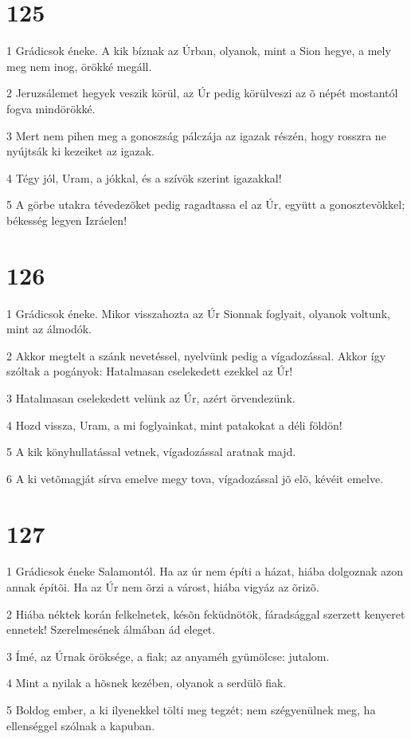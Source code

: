\chapter{125}

\par 1 Grádicsok éneke. A kik bíznak az Úrban, olyanok, mint a Sion hegye, a mely meg nem inog, örökké megáll.
\par 2 Jeruzsálemet hegyek veszik körül, az Úr pedig körülveszi az õ népét mostantól fogva mindörökké.
\par 3 Mert nem pihen meg a gonoszság pálczája az igazak részén, hogy rosszra ne nyújtsák ki kezeiket az igazak.
\par 4 Tégy jól, Uram, a jókkal, és a szívök szerint igazakkal!
\par 5 A görbe utakra tévedezõket pedig ragadtassa el az Úr, együtt a gonosztevõkkel; békesség legyen Izráelen!

\chapter{126}

\par 1 Grádicsok éneke. Mikor visszahozta az Úr Sionnak foglyait, olyanok voltunk, mint az álmodók.
\par 2 Akkor megtelt a szánk nevetéssel, nyelvünk pedig a vígadozással. Akkor így szóltak a pogányok: Hatalmasan cselekedett ezekkel az Úr!
\par 3 Hatalmasan cselekedett velünk az Úr, azért örvendezünk.
\par 4 Hozd vissza, Uram, a mi foglyainkat, mint patakokat a déli földön!
\par 5 A kik könyhullatással vetnek, vígadozással aratnak majd.
\par 6 A ki vetõmagját sírva emelve megy tova, vígadozással jõ elõ, kévéit emelve.

\chapter{127}

\par 1 Grádicsok éneke Salamontól. Ha az úr nem építi a házat, hiába dolgoznak azon annak építõi. Ha az Úr nem õrzi a várost, hiába vigyáz az õrizõ.
\par 2 Hiába néktek korán felkelnetek, késõn feküdnötök, fáradsággal szerzett kenyeret ennetek! Szerelmesének álmában ád eleget.
\par 3 Ímé, az Úrnak öröksége, a fiak; az anyaméh gyümölcse: jutalom.
\par 4 Mint a nyilak a hõsnek kezében, olyanok a serdülõ fiak.
\par 5 Boldog ember, a ki ilyenekkel tölti meg tegzét; nem szégyenülnek meg, ha ellenséggel szólnak a kapuban.

